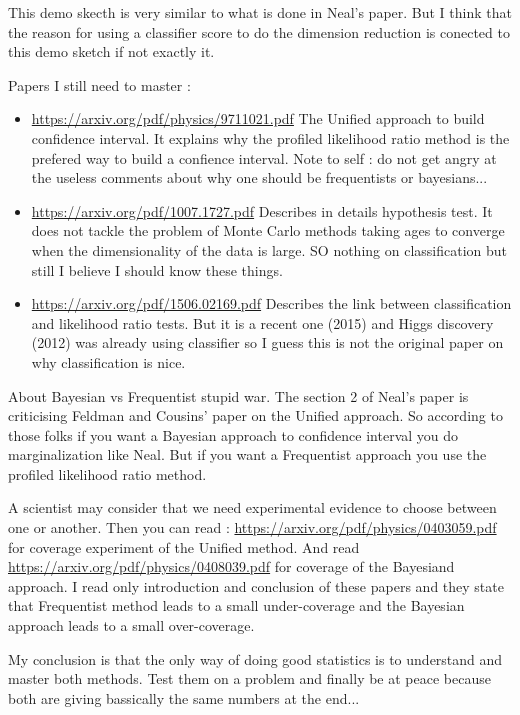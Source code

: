 This demo skecth is very similar to what is done in Neal's paper.
But I think that the reason for using a classifier score to do the dimension reduction is conected to this demo sketch if not exactly it. 



Papers I still need to master :
\begin{itemize}
 	\item \url{https://arxiv.org/pdf/physics/9711021.pdf} The Unified approach to build confidence interval. It explains why the profiled likelihood ratio method is the prefered way to build a confience interval. Note to self : do not get angry at the useless comments about why one should be frequentists or bayesians...
 	\item \url{https://arxiv.org/pdf/1007.1727.pdf} Describes in details hypothesis test. It does not tackle the problem of Monte Carlo methods taking ages to converge when the dimensionality of the data is large. SO nothing on classification but still I believe I should know these things.
 	\item \url{https://arxiv.org/pdf/1506.02169.pdf} Describes the link between classification and likelihood ratio tests. But it is a recent one (2015) and Higgs discovery (2012) was already using classifier so I guess this is not the original paper on why classification is nice.
 \end{itemize} 


About Bayesian vs Frequentist stupid war.
The section 2 of Neal's paper is criticising Feldman and Cousins' paper on the Unified approach.
So according to those folks if you want a Bayesian approach to confidence interval you do marginalization like Neal.
But if you want a Frequentist approach you use the profiled likelihood ratio method.

A scientist may consider that we need experimental evidence to choose between one or another.
Then you can read : \url{https://arxiv.org/pdf/physics/0403059.pdf} for coverage experiment of the Unified method.
And read \url{https://arxiv.org/pdf/physics/0408039.pdf} for coverage of the Bayesiand approach.
I read only introduction and conclusion of these papers and they state that Frequentist method leads to a small under-coverage and the Bayesian approach leads to a small over-coverage.

My conclusion is that the only way of doing good statistics is to understand and master both methods.
Test them on a problem and finally be at peace because both are giving bassically the same numbers at the end...

